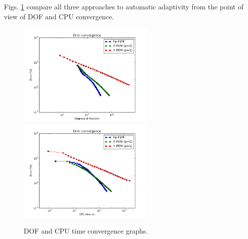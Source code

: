 Figs. \ref{fig:nist-11-conv} compare all
three approaches to automatic adaptivity from the point
of view of DOF and CPU convergence.

\begin{figure}[!ht]
\centering
\includegraphics[height=5cm]{nist/nist-11/conv_dof_aniso.png}\ \
\includegraphics[height=5cm]{nist/nist-11/conv_cpu_aniso.png}
\caption{DOF and CPU time convergence graphs.}
\label{fig:nist-11-conv}
\end{figure}

